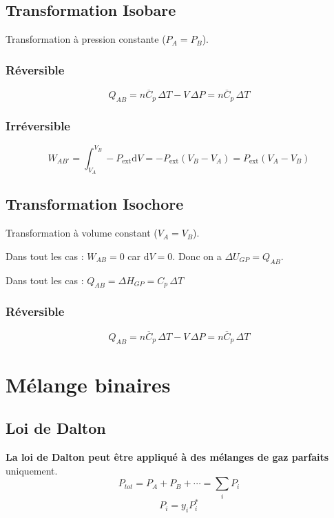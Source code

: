 \documentclass[a4paper,12pt]{article}
\newcommand{\diff}{\mathrm{d}} %
\newcommand{\Cp}{\overline{C}_p} %
\begin{document}
    \subsection{Transformation Isobare}
        
        Transformation à pression constante ($P_A=P_B$).

        \subsubsection{Réversible}
            $$ Q_{AB} = n \Cp \, \Delta T - V \, \Delta P = n \Cp \, \Delta T $$
        
        \subsubsection{Irréversible}
            $$ W_{AB'} = \int_{V_A}^{V_B} -P_{\text{ext}} \diff V = -P_{\text{ext}}(V_B-V_A) = P_{\text{ext}}(V_A-V_B) $$

    \subsection{Transformation Isochore}

        Transformation à volume constant ($V_A=V_B$).

        Dans tout les cas : $ W_{AB} = 0 $ car $ \diff V = 0 $. Donc on a $ \Delta U_{GP} = Q_{AB} $.
        
        Dans tout les cas : $Q_{AB} = \Delta H_{GP} = C_p \, \Delta T $
                
        \subsubsection{Réversible}

             $$ Q_{AB} = n \Cp \, \Delta T - V \, \Delta P = n \Cp \, \Delta T $$

        \clearpage

    \section{Mélange binaires}
        
        \subsection{Loi de Dalton}
            
            \textbf{La loi de Dalton peut être appliqué à des mélanges de gaz parfaits} uniquement.
                $$ P_{tot} = P_A + P_B + \cdots = \sum_i P_i $$
                $$ \boxed{ P_i = y_i P_{i}^* } $$
\end{document}
